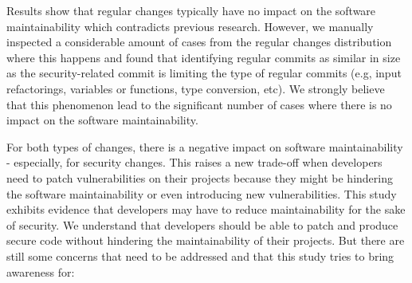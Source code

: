 \documentclass[10pt,conference]{IEEEtran}
\newcommand\Sof[1]{\nb{Sofia}{red}{#1}}
\begin{document}
Results show that regular changes typically have no impact on the 
software maintainability which contradicts previous research\Sof{missing citation}.
However, we manually inspected a considerable amount of cases from
the regular changes distribution where this happens and found that 
identifying regular commits as similar in size as the security-related 
commit is limiting the type of regular commits (e.g, input 
refactorings, variables or functions, type conversion, etc).  
We strongly believe that this phenomenon lead
to the significant number of cases where there is no impact
on the software maintainability.

For both types of changes, there is a negative impact
on software maintainability - especially, for security changes. This raises 
a new trade-off when developers need to patch vulnerabilities on their projects
because they might be hindering the software maintainability or even introducing
new vulnerabilities. This study exhibits evidence that developers may have to
reduce maintainability for the sake of security. We understand that developers
should be able to patch and produce secure code without hindering the maintainability of
their projects. But there are still some concerns that need to be addressed
and that this study tries to bring awareness for:
\end{document}

